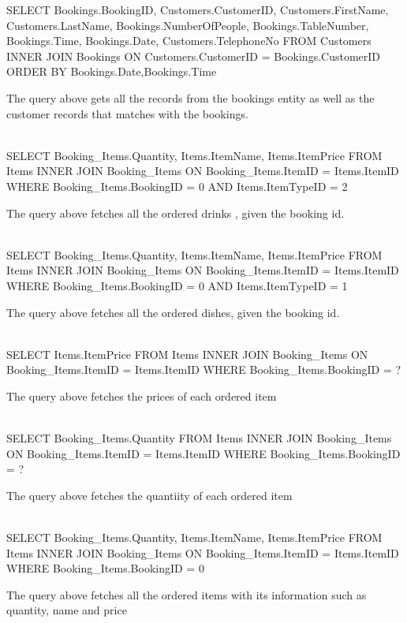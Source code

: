 \begin{sql}
SELECT
 Bookings.BookingID,
 Customers.CustomerID,
Customers.FirstName,
Customers.LastName,
Bookings.NumberOfPeople,
 Bookings.TableNumber,
 Bookings.Time,
Bookings.Date,
Customers.TelephoneNo
 FROM Customers
 INNER JOIN Bookings
 ON Customers.CustomerID = Bookings.CustomerID
 ORDER BY Bookings.Date,Bookings.Time
\end{sql}
The query above gets all the records from the bookings entity as well as the customer records that matches with the bookings. \\ \\

\begin{sql}
SELECT
Booking_Items.Quantity,
 Items.ItemName,
 Items.ItemPrice
 FROM Items
 INNER JOIN Booking_Items
ON Booking_Items.ItemID = Items.ItemID
 WHERE Booking_Items.BookingID = {0}
AND Items.ItemTypeID = 2
\end{sql}
The query above fetches all the ordered drinks , given the booking id. \\ \\

\begin{sql}
SELECT
 Booking_Items.Quantity,
 Items.ItemName,
 Items.ItemPrice
 FROM Items
 INNER JOIN Booking_Items
ON Booking_Items.ItemID = Items.ItemID
 WHERE Booking_Items.BookingID = {0}
 AND Items.ItemTypeID = 1
\end{sql}
The query above fetches all the ordered dishes, given the booking id. \\ \\

\begin{sql}
SELECT
Items.ItemPrice
 FROM Items
 INNER JOIN Booking_Items
 ON Booking_Items.ItemID = Items.ItemID
WHERE Booking_Items.BookingID = ?
\end{sql}
The query above fetches the prices of each ordered item \\ \\


\begin{sql}
SELECT
 Booking_Items.Quantity
 FROM Items
 INNER JOIN Booking_Items
 ON Booking_Items.ItemID = Items.ItemID
 WHERE Booking_Items.BookingID = ? 
\end{sql}
The query above fetches the quantiity of each ordered item \\ \\

\begin{sql}
SELECT
 Booking_Items.Quantity,
 Items.ItemName,
 Items.ItemPrice
 FROM Items
 INNER JOIN Booking_Items
 ON Booking_Items.ItemID = Items.ItemID
 WHERE Booking_Items.BookingID = {0}
\end{sql}
The query above fetches all the ordered items with its information such as quantity, name and price \\ \\


